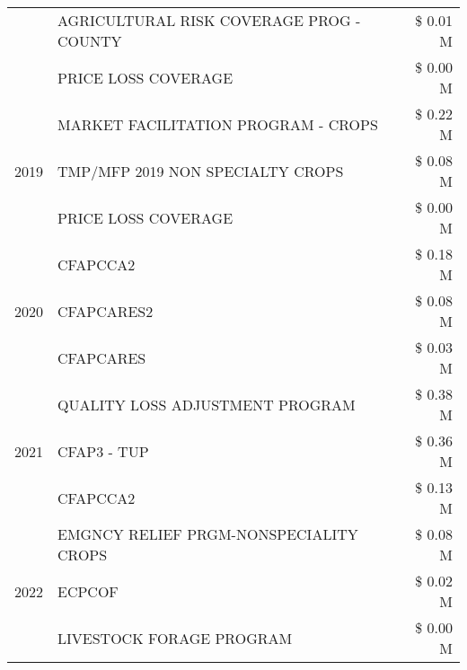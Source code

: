 \begin{tabular}{llr}
 & AGRICULTURAL RISK COVERAGE PROG - COUNTY & \$ 0.01 M \\
 & PRICE LOSS COVERAGE & \$ 0.00 M \\
\cline{1-3}
\multirow[t]{3}{*}{2019} & MARKET FACILITATION PROGRAM - CROPS & \$ 0.22 M \\
 & TMP/MFP 2019 NON SPECIALTY CROPS & \$ 0.08 M \\
 & PRICE LOSS COVERAGE & \$ 0.00 M \\
\cline{1-3}
\multirow[t]{3}{*}{2020} & CFAPCCA2 & \$ 0.18 M \\
 & CFAPCARES2 & \$ 0.08 M \\
 & CFAPCARES & \$ 0.03 M \\
\cline{1-3}
\multirow[t]{3}{*}{2021} & QUALITY LOSS ADJUSTMENT PROGRAM & \$ 0.38 M \\
 & CFAP3 - TUP & \$ 0.36 M \\
 & CFAPCCA2 & \$ 0.13 M \\
\cline{1-3}
\multirow[t]{3}{*}{2022} & EMGNCY RELIEF PRGM-NONSPECIALITY CROPS & \$ 0.08 M \\
 & ECPCOF & \$ 0.02 M \\
 & LIVESTOCK FORAGE PROGRAM & \$ 0.00 M \\
\cline{1-3}
\bottomrule
\end{tabular}
